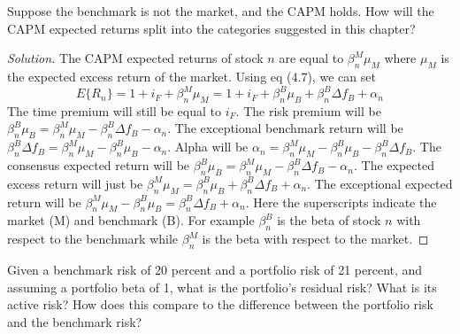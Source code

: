 \begin{problem}{4.2}
 Suppose the benchmark is not the market, and the CAPM holds. How will the CAPM expected returns split into the categories suggested in this chapter?
\end{problem}

\begin{proof}[Solution]
 The CAPM expected returns of stock $n$ are equal to $\beta_{n}^{M}\mu_{M}$ where $\mu_{M}$ is the expected excess return of the market. Using eq (4.7), we can set 
 \begin{equation*}
  E\{R_{n}\}=1+i_{F}+\beta_{n}^{M}\mu_{M}=1+i_{F}+\beta_{n}^{B}\mu_{B}+\beta_{n}^{B}\Delta f_{B}+\alpha_{n}
 \end{equation*}
 The time premium will still be equal to $i_{F}$. The risk premium will be $\beta_{n}^{B}\mu_{B}=\beta_{n}^{M}\mu_{M}-\beta_{n}^{B}\Delta f_{B}-\alpha_{n}$. The exceptional benchmark return will be $\beta_{n}^{B}\Delta f_{B}=\beta_{n}^{M}\mu_{M}-\beta_{n}^{B}\mu_{B}-\alpha_{n}$. Alpha will be $\alpha_{n}=\beta_{n}^{M}\mu_{M}-\beta_{n}^{B}\mu_{B}-\beta_{n}^{B}\Delta f_{B}$. The consensus expected return will be $\beta_{n}^{B}\mu_{B}=\beta_{n}^{M}\mu_{M}-\beta_{n}^{B}\Delta f_{B}-\alpha_{n}$. The expected excess return will just be $\beta_{n}^{M}\mu_{M}=\beta_{n}^{B}\mu_{B}+\beta_{n}^{B}\Delta f_{B}+\alpha_{n}$. The exceptional expected return will be $\beta_{n}^{M}\mu_{M}-\beta_{n}^{B}\mu_{B}=\beta_{n}^{B}\Delta f_{B}+\alpha_{n}$. Here the superscripts indicate the market (M) and benchmark (B). For example $\beta_{n}^{B}$ is the beta of stock $n$ with respect to the benchmark while $\beta_{n}^{M}$ is the beta with respect to the market.
\end{proof}

\begin{problem}{4.3}
 Given a benchmark risk of 20 percent and a portfolio risk of 21 percent, and assuming a portfolio beta of 1, what is the portfolio's residual risk? What is its active risk? How does this compare to the difference between the portfolio risk and the benchmark risk?
\end{problem}

